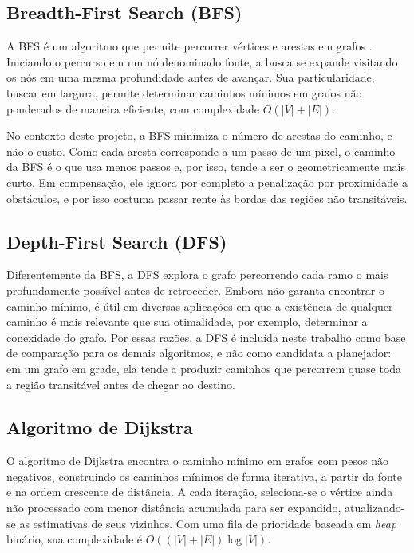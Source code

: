 \documentclass[
    12pt,
    openright,
    oneside,
    a4paper,
    english,
    brazil
]{abntex2}
\begin{document}
\subsection{Breadth-First Search (BFS)}

A BFS é um algoritmo que permite percorrer vértices e arestas em grafos \cite{cormen2009, moore1959}. Iniciando o percurso em um nó denominado fonte, a busca se expande visitando os nós em uma mesma profundidade antes de avançar. Sua particularidade, buscar em largura, permite determinar caminhos mínimos em grafos não ponderados de maneira eficiente, com complexidade $O(|V| + |E|)$.

No contexto deste projeto, a BFS minimiza o número de arestas do caminho, e não o custo. Como cada aresta corresponde a um passo de um pixel, o caminho da BFS é o que usa menos passos e, por isso, tende a ser o geometricamente mais curto. Em compensação, ele ignora por completo a penalização por proximidade a obstáculos, e por isso costuma passar rente às bordas das regiões não transitáveis.

\subsection{Depth-First Search (DFS)}

Diferentemente da BFS, a DFS \cite{cormen2009} explora o grafo percorrendo cada ramo o mais profundamente possível antes de retroceder. Embora não garanta encontrar o caminho mínimo, é útil em diversas aplicações em que a existência de qualquer caminho é mais relevante que sua otimalidade, por exemplo, determinar a conexidade do grafo. Por essas razões, a DFS é incluída neste trabalho como base de comparação para os demais algoritmos, e não como candidata a planejador: em um grafo em grade, ela tende a produzir caminhos que percorrem quase toda a região transitável antes de chegar ao destino.

\subsection{Algoritmo de Dijkstra}

O algoritmo de Dijkstra \cite{dijkstra1959} encontra o caminho mínimo em grafos com pesos não negativos, construindo os caminhos mínimos de forma iterativa, a partir da fonte e na ordem crescente de distância. A cada iteração, seleciona-se o vértice ainda não processado com menor distância acumulada para ser expandido, atualizando-se as estimativas de seus vizinhos. Com uma fila de prioridade baseada em \textit{heap} binário, sua complexidade é $O((|V| + |E|) \log |V|)$.
\end{document}
